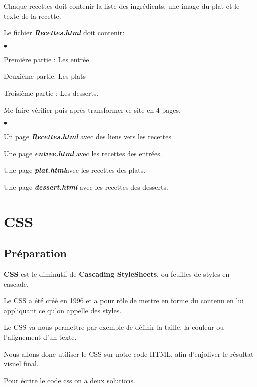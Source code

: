 \documentclass[10pt,dvipsnames, dvips, svgnames]{article}
\newlength\taille
\begin{document}
Chaque recettes doit contenir la liste des ingrédients, une image du plat et le texte de la recette.

Le fichier \textbf{\textit{Recettes.html}} doit contenir:

\begin{list}{$\bullet$}{}
\item Première partie : Les entrée
\item Deuxième  partie:  Les plats
\item Troisième partie : Les desserts.
\end{list}

Me faire vérifier puis après transformer ce site en 4 pages.

\begin{list}{$\bullet$}{}
\item Un page \textbf{\textit{Recettes.html}} avec des liens vers les recettes
\item Une page \textbf{\textit{entree.html}} avec les recettes des entrées.
\item Une page \textbf{\textit{plat.html}}avec les recettes des plats.
\item Une page \textbf{\textit{dessert.html}} avec les recettes des desserts.
\end{list}


\section{CSS}

\subsection{Préparation}



\textbf{CSS} est le diminutif de \textbf{Cascading StyleSheets}, ou feuilles de styles en cascade.

Le CSS a été créé en 1996 et a pour rôle de mettre en forme du contenu en lui appliquant ce qu'on appelle des styles.

Le CSS va nous permettre par exemple de définir la taille, la couleur ou l'alignement d'un texte.

Nous allons donc utiliser le CSS sur notre code HTML, afin d'enjoliver le résultat visuel final.


Pour écrire le  code css on a deux solutions.
\end{document}

